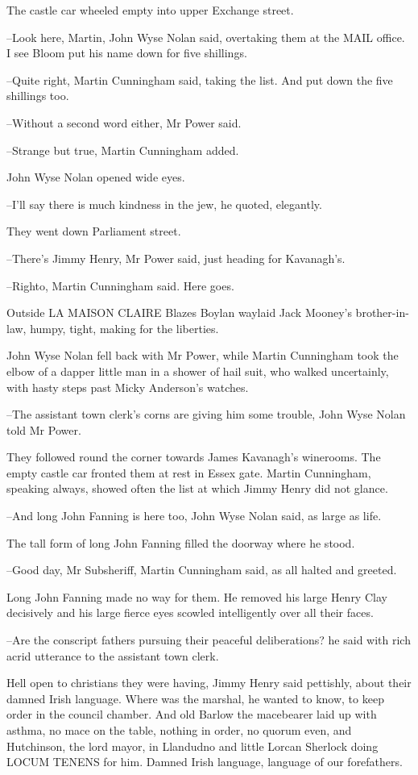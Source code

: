 The castle car wheeled empty into upper Exchange street.

--Look here, Martin, John Wyse Nolan said, overtaking them at the MAIL
office. I see Bloom put his name down for five shillings.

--Quite right, Martin Cunningham said, taking the list. And put down the
five shillings too.

--Without a second word either, Mr Power said.

--Strange but true, Martin Cunningham added.

John Wyse Nolan opened wide eyes.

--I'll say there is much kindness in the jew, he quoted, elegantly.

They went down Parliament street.

--There's Jimmy Henry, Mr Power said, just heading for Kavanagh's.

--Righto, Martin Cunningham said. Here goes.

Outside LA MAISON CLAIRE Blazes Boylan waylaid Jack Mooney's brother-in-
law, humpy, tight, making for the liberties.

John Wyse Nolan fell back with Mr Power, while Martin Cunningham took the
elbow of a dapper little man in a shower of hail suit, who walked
uncertainly, with hasty steps past Micky Anderson's watches.

--The assistant town clerk's corns are giving him some trouble, John Wyse
Nolan told Mr Power.

They followed round the corner towards James Kavanagh's winerooms. The
empty castle car fronted them at rest in Essex gate. Martin Cunningham,
speaking always, showed often the list at which Jimmy Henry did not
glance.

--And long John Fanning is here too, John Wyse Nolan said, as large as
life.

The tall form of long John Fanning filled the doorway where he stood.

--Good day, Mr Subsheriff, Martin Cunningham said, as all halted and
greeted.

Long John Fanning made no way for them. He removed his large Henry Clay
decisively and his large fierce eyes scowled intelligently over all their
faces.

--Are the conscript fathers pursuing their peaceful deliberations? he
said with rich acrid utterance to the assistant town clerk.

Hell open to christians they were having, Jimmy Henry said pettishly,
about their damned Irish language. Where was the marshal, he wanted to
know, to keep order in the council chamber. And old Barlow the macebearer
laid up with asthma, no mace on the table, nothing in order, no quorum
even, and Hutchinson, the lord mayor, in Llandudno and little Lorcan
Sherlock doing LOCUM TENENS for him. Damned Irish language, language of
our forefathers.

